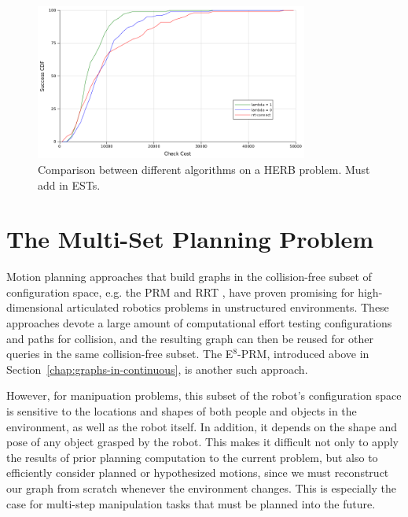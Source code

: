 \begin{figure}
   \centering
   \includegraphics[width=0.8\textwidth]{figs/timegreedy-herbstep1-comparison-cdfs.png}
   \caption{Comparison between different algorithms on a HERB problem.
      Must add in ESTs.}
   \label{fig:herb-comparison-cdfs}
\end{figure}



\section{The Multi-Set Planning Problem}
\label{chap:multi-set}

Motion planning approaches that build graphs
in the collision-free subset of
configuration space,
e.g. the
PRM \cite{kavrakietal1996prm}
and RRT \cite{lavallekuffner1999rrt},
have proven promising
for high-dimensional articulated robotics problems
in unstructured environments.
These approaches devote a large amount of computational effort
testing configurations and paths for collision,
and the resulting graph can then be reused
for other queries in the same collision-free subset.
The E$^8$-PRM,
introduced above in Section~\ref{chap:graphs-in-continuous},
is another such approach.

However,
for manipuation problems,
this subset of the robot's configuration space
is sensitive to the locations and shapes of
both people and objects in the environment,
as well as the robot itself.
In addition, it depends on the shape and pose of any object
grasped by the robot.
This makes it difficult not only to apply the results of prior
planning computation to the current problem,
but also to efficiently consider planned or hypothesized motions,
since we must reconstruct our graph from scratch whenever
the environment changes.
This is especially the case for
multi-step manipulation tasks that must be planned into the future.

